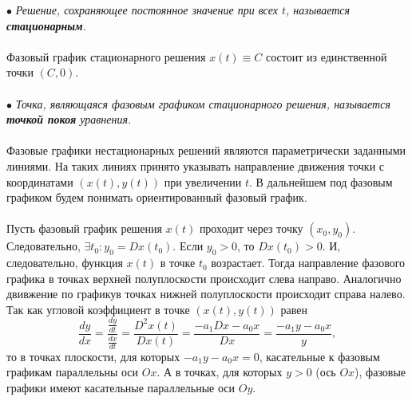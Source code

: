 \documentclass[a4paper, 12pt]{report}
\begin{document}
$\bullet$ \textit{Решение, сохраняющее постоянное значение при всех $t$, называется \textbf{стационарным}.}\\\\
Фазовый график стационарного решения $x(t)\equiv C$ состоит из единственной точки $(C, 0)$.\\\\
$\bullet$ \textit{Точка, являющаяся фазовым графиком стационарного решения, называется \textbf{точкой покоя} уравнения.}\\\\
Фазовые графики нестационарных решений являются параметрически заданными линиями. На таких линиях принято указывать направление движения точки с координатами $(x(t), y(t))$ при увеличении $t$. В дальнейшем под фазовым графиком будем понимать ориентированный фазовый график.\\\\
Пусть фазовый график решения $x(t)$ проходит через точку $(x_0, y_0)$. Следовательно, $\exists t_0 : y_0 = Dx(t_0)$. Если $y_0 > 0$, то $Dx(t_0) > 0$. И, следовательно, функция $x(t)$ в точке $t_0$ возрастает. Тогда направление фазового графика в точках верхней полуплоскости происходит слева направо. Аналогично двивжение по графикув точках нижней полуплоскости происходит справа налево. Так как угловой коэффициент в точке $(x(t), y(t))$ равен $$\dfrac{dy}{dx} = \dfrac{\frac{dy}{dt}}{\frac{dx}{dt}} = \dfrac{D^2x(t)}{Dx(t)} = \dfrac{-a_1Dx - a_0x}{Dx} = \dfrac{-a_1y-a_0x}{y},$$ то в точках плоскости, для которых $-a_1y-a_0x = 0$, касательные к фазовым графикам параллельны оси $Ox$. А в точках, для которых $y > 0$ (ось $Ox$), фазовые графики имеют касательные параллельные оси $Oy$.
\end{document}
